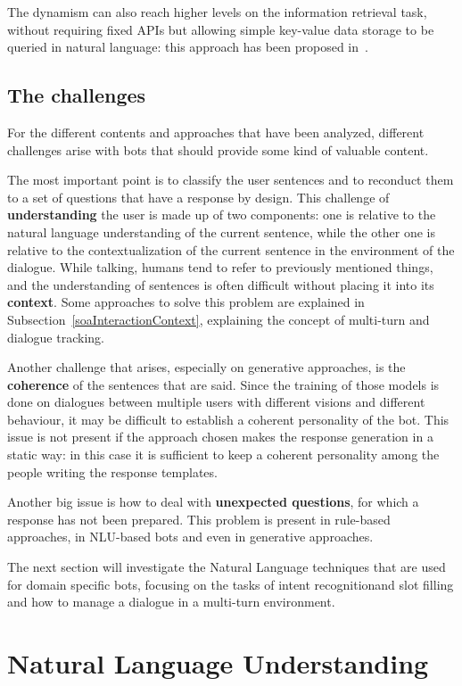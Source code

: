 The dynamism can also reach higher levels on the information retrieval task, without requiring fixed APIs but allowing simple key-value data storage to be queried in natural language: this approach has been proposed in~\cite{eric2017key}.

\subsection{The challenges}
\label{soaChallenges}

For the different contents and approaches that have been analyzed, different challenges arise with bots that should provide some kind of valuable content.

The most important point is to classify the user sentences and to reconduct them to a set of questions that have a response by design. This challenge of \textbf{understanding} the user is made up of two components: one is relative to the natural language understanding of the current sentence, while the other one is relative to the contextualization of the current sentence in the environment of the dialogue. While talking, humans tend to refer to previously mentioned things, and the understanding of sentences is often difficult without placing it into its \textbf{context}. Some approaches to solve this problem are explained in Subsection~\ref{soaInteractionContext}, explaining the concept of multi-turn and dialogue tracking.

Another challenge that arises, especially on generative approaches, is the \textbf{coherence} of the sentences that are said. Since the training of those models is done on dialogues between multiple users with different visions and different behaviour, it may be difficult to establish a coherent personality of the bot. This issue is not present if the approach chosen makes the response generation in a static way: in this case it is sufficient to keep a coherent personality among the people writing the response templates.

Another big issue is how to deal with \textbf{unexpected questions}, for which a response has not been prepared. This problem is present in rule-based approaches, in NLU-based bots and even in generative approaches.

The next section will investigate the Natural Language techniques that are used for domain specific bots, focusing on the tasks of intent recognitionand slot filling and how to manage a dialogue in a multi-turn environment.

\section{Natural Language Understanding}
\label{soaNLU}

